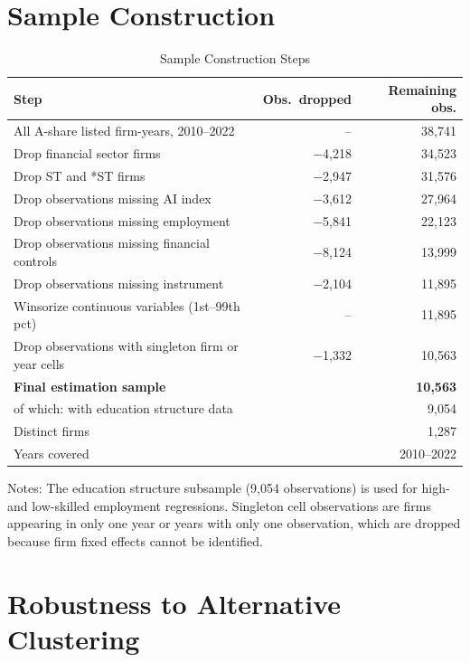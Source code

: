 \documentclass[12pt,a4paper]{article}
\theoremstyle{predstyle}
\theoremstyle{plain}
\begin{document}
\begin{appendices}
\section{Sample Construction}
\label{app:sample}

\begin{table}[H]
\centering
\caption{Sample Construction Steps}
\label{tab:sampleconstruction}
\begin{threeparttable}
\small
\begin{tabular}{lrr}
\toprule
Step & Obs.\ dropped & Remaining obs. \\
\midrule
All A-share listed firm-years, 2010--2022 & -- & 38,741 \\
Drop financial sector firms & $-$4,218 & 34,523 \\
Drop ST and *ST firms & $-$2,947 & 31,576 \\
Drop observations missing AI index & $-$3,612 & 27,964 \\
Drop observations missing employment & $-$5,841 & 22,123 \\
Drop observations missing financial controls & $-$8,124 & 13,999 \\
Drop observations missing instrument & $-$2,104 & 11,895 \\
Winsorize continuous variables (1st--99th pct) & -- & 11,895 \\
Drop observations with singleton firm or year cells & $-$1,332 & 10,563 \\
\midrule
\textbf{Final estimation sample} & & \textbf{10,563} \\
\quad of which: with education structure data & & 9,054 \\
\quad Distinct firms & & 1,287 \\
\quad Years covered & & 2010--2022 \\
\bottomrule
\end{tabular}
\begin{tablenotes}
\footnotesize
\item Notes: The education structure subsample (9,054 observations) is used for high- and low-skilled employment regressions. Singleton cell observations are firms appearing in only one year or years with only one observation, which are dropped because firm fixed effects cannot be identified.
\end{tablenotes}
\end{threeparttable}
\end{table}

\section{Robustness to Alternative Clustering}
\label{app:clustering}


\end{appendices}
\end{document}
